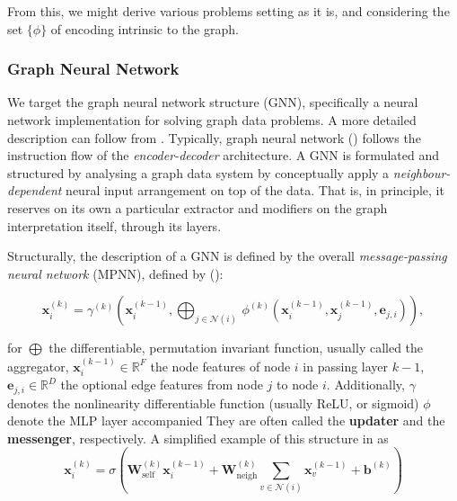 From this, we might derive various problems setting as it is, and considering the set $\{\phi\}$ of encoding intrinsic to the graph. 

\subsubsection{Graph Neural Network}

We target the graph neural network structure (GNN), specifically a neural network implementation for solving graph data problems. A more detailed description can follow from \cite{GRP_Hamilton,Scar04}. Typically, graph neural network (\cite{Scar04,Veli_kovi__2023,tanis2024introductiongraphneuralnetworks,lopushanskyy2024graphneuralnetworksgraph}) follows the instruction flow of the \textit{encoder-decoder} architecture. A GNN is formulated and structured by analysing a graph data system by conceptually apply a \textit{neighbour-dependent} neural input arrangement on top of the data. That is, in principle, it reserves on its own a particular extractor and modifiers on the graph interpretation itself, through its layers. 

Structurally, the description of a GNN is defined by the overall \textit{message-passing neural network} (MPNN), defined by (\cite{pyg_docs,Fey/Lenssen/2019}): 

\begin{equation}
    \mathbf{x}_i^{(k)} = \gamma^{(k)} \left( \mathbf{x}_i^{(k-1)}, \bigoplus_{j \in \mathcal{N}(i)} \, \phi^{(k)}\left(\mathbf{x}_i^{(k-1)}, \mathbf{x}_j^{(k-1)},\mathbf{e}_{j,i}\right) \right),
\end{equation}

for $\bigoplus$ the differentiable, permutation invariant function, usually called the aggregator, $\mathbf{x}^{(k-1)}_i \in \mathbb{R}^F$ the node features of node $i$ in passing layer $k-1$, $\mathbf{e}_{j,i} \in \mathbb{R}^D$ the optional edge features from node $j$ to node $i$. Additionally, $\gamma$ denotes the nonlinearity differentiable function (usually ReLU, or sigmoid) $\phi$ denote the MLP layer accompanied They are often called the \textbf{updater} and the \textbf{messenger}, respectively. A simplified example of this structure in \cite{Scar04,GRP_Hamilton} as 
\begin{equation}
    \mathbf{x}_i^{(k)} = \sigma \left( \mathbf{W}_{\mathrm{self}}^{(k)} \mathbf{x}_i^{(k-1)} +  \mathbf{W}_{\mathrm{neigh}}^{(k)} \sum_{v\in \mathcal{N}(i)} \mathbf{x}_v^{(k-1)} + \mathbf{b}^{(k)} \right)
\end{equation}

